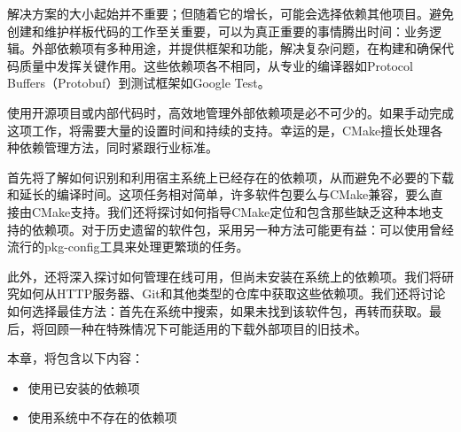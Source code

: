 解决方案的大小起始并不重要；但随着它的增长，可能会选择依赖其他项目。避免创建和维护样板代码的工作至关重要，可以为真正重要的事情腾出时间：业务逻辑。外部依赖项有多种用途，并提供框架和功能，解决复杂问题，在构建和确保代码质量中发挥关键作用。这些依赖项各不相同，从专业的编译器如Protocol Buffers（Protobuf）到测试框架如Google Test。

使用开源项目或内部代码时，高效地管理外部依赖项是必不可少的。如果手动完成这项工作，将需要大量的设置时间和持续的支持。幸运的是，CMake擅长处理各种依赖管理方法，同时紧跟行业标准。

首先将了解如何识别和利用宿主系统上已经存在的依赖项，从而避免不必要的下载和延长的编译时间。这项任务相对简单，许多软件包要么与CMake兼容，要么直接由CMake支持。我们还将探讨如何指导CMake定位和包含那些缺乏这种本地支持的依赖项。对于历史遗留的软件包，采用另一种方法可能更有益：可以使用曾经流行的pkg-config工具来处理更繁琐的任务。

此外，还将深入探讨如何管理在线可用，但尚未安装在系统上的依赖项。我们将研究如何从HTTP服务器、Git和其他类型的仓库中获取这些依赖项。我们还将讨论如何选择最佳方法：首先在系统中搜索，如果未找到该软件包，再转而获取。最后，将回顾一种在特殊情况下可能适用的下载外部项目的旧技术。

本章，将包含以下内容：

\begin{itemize}
\item
使用已安装的依赖项

\item
使用系统中不存在的依赖项
\end{itemize}

















